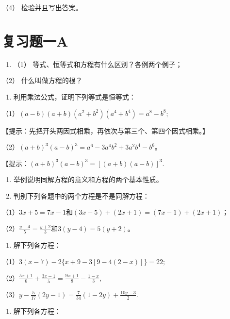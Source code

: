 （4） 检验并且写出答案。

\section{复习题一A}

\begin{enumerate}
\item
  （1） 等式、恒等式和方程有什么区别？各例两个例子；
\end{enumerate}

（2） 什么叫做方程的根？

\begin{enumerate}[start=2]
\item
  利用乘法公式，证明下列等式是恒等式：
\end{enumerate}

（1）\((a - b)(a + b)(a^2 + b^2)(a^4 + b^4) = a^8 - b^8;\)

【提示：先把开头两因式相乘，再依次与第三个、第四个因式相乘。】

（2）\((a + b)^{3}(a - b)^{3} = a^{6} - 3a^{4}b^{2} + 3a^{2}b^{4} - b^{6}\)。

【提示：\((a + b)^{3}(a - b)^{3} = [(a + b)(a - b)]^{3}.\)

\begin{enumerate}[start=3]
\item
  举例说明同解方程的意义和方程的两个基本性质。
\item
  判别下列各题中的两个方程是不是同解方程：
\end{enumerate}

（1）\(3x + 5 = 7x - 1\)和\((3x + 5) + (2x + 1) = (7x - 1) + (2x + 1)\)；

（2）\(\frac{y - 4}{5} = \frac{y + 2}{3}\)和\(3(y - 4) = 5(y + 2)\)。

\begin{enumerate}[start=5]
\item
  解下列各方程：
\end{enumerate}

（1）\(3(x - 7) - 2\{x + 9 - 3[9 - 4(2 - x)]\} = 22;\)

（2）\(\frac{5x + 1}{6} +\frac{3x - 1}{5} = \frac{9x + 1}{8} -\frac{1 - x}{3},\)

（3）\(y - \frac{5}{17}(2y - 1) = \frac{7}{34}(1 - 2y) + \frac{10y - 3}{2}.\)

\begin{enumerate}[start=6]
\item
  解下列各方程：
\end{enumerate}

